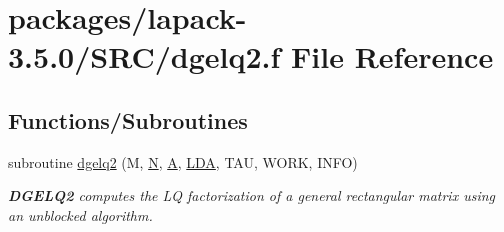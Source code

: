 \hypertarget{dgelq2_8f}{}\section{packages/lapack-\/3.5.0/\+S\+R\+C/dgelq2.f File Reference}
\label{dgelq2_8f}
\subsection*{Functions/\+Subroutines}
\begin{DoxyCompactItemize}
\item 
subroutine \hyperlink{group__doubleGEcomputational_ga2f10ebf79772a5399be9ed6169c9d975}{dgelq2} (M, \hyperlink{polmisc_8c_a0240ac851181b84ac374872dc5434ee4}{N}, \hyperlink{classA}{A}, \hyperlink{example__user_8c_ae946da542ce0db94dced19b2ecefd1aa}{L\+D\+A}, T\+A\+U, W\+O\+R\+K, I\+N\+F\+O)
\begin{DoxyCompactList}\small\item\em {\bfseries D\+G\+E\+L\+Q2} computes the L\+Q factorization of a general rectangular matrix using an unblocked algorithm. \end{DoxyCompactList}\end{DoxyCompactItemize}
